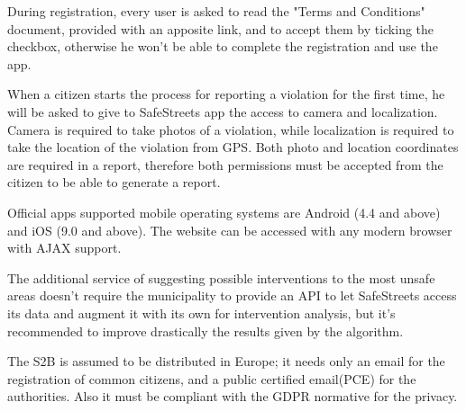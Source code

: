 During registration, every user is asked to read the "Terms and Conditions" document, provided with an apposite link, and to accept them by ticking the checkbox, otherwise he won't be able to complete the registration and use the app.

When a citizen starts the process for reporting a violation for the first time, he will be asked to give to SafeStreets app the access to camera and localization. Camera is required to take photos of a violation, while localization is required to take the location of the violation from GPS. Both photo and location coordinates are required in a report, therefore both permissions must be accepted from the citizen to be able to generate a report.

Official apps supported mobile operating systems are Android (4.4 and above) and iOS (9.0 and above). The website can be accessed with any modern browser with AJAX support.

The additional service of suggesting possible interventions to the most unsafe areas doesn't require the municipality to provide an API to let SafeStreets access its data and augment it with its own for intervention analysis, but it's recommended to improve drastically the results given by the algorithm.

The S2B is assumed to be distributed in Europe; it needs only an email for the registration of common citizens, and a public certified email(PCE) for the authorities. Also it must be compliant with the GDPR normative for the privacy.